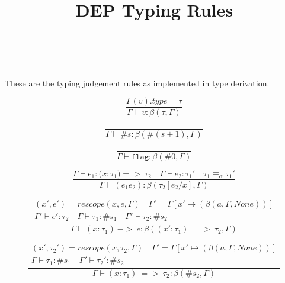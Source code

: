 \documentclass[12pt]{scrartcl}
\title{DEP Typing Rules}
\newcommand{\prove}[2]{\Gamma \vdash #1 : #2 }
\newcommand{\bprove}[2]{\prove{#1}{\beta(#2, \Gamma)}}
\begin{document}

\author{\thename \\ \small{\theemail}}
\maketitle


\noindent

These are the typing judgement rules as implemented in type derivation.

\begin{minipage}[c]{.35\linewidth}
\begin{equation}
  \frac{
    \Gamma(v).type = \tau
  }{\bprove{v}{\tau}}
\end{equation}

\begin{equation}
  \frac{
  }{\bprove{\#s}{\#(s+1)}}
\end{equation}

\begin{equation}
  \frac{
  }{\bprove{\mathtt{flag}}{\#0}}
\end{equation}
\end{minipage} \begin{minipage}[c]{0.6\linewidth}
\begin{equation}
  \frac{
    \prove{e_1}{\mathtt{(} x \mathtt{:} \tau_1 \mathtt{) => \:} \tau_2}{} \quad
    \prove{e_2}{\tau_1'} \quad
    \tau_1 \equiv_\alpha \tau_1'
  }{\bprove{(e_1 e_2)}{\tau_2[e_2/x]}}
\end{equation}

\begin{equation}
  \frac{
    \begin{array}{cc}
      (x', e') = rescope(x, e, \Gamma) \quad
      \Gamma' = \Gamma[x' \mapsto (\beta(a, \Gamma, None))] \\
      \Gamma' \vdash e' : \tau_2 \quad
      \prove{\tau_1}{\#s_1} \quad
      \Gamma' \vdash \tau_2 : \#s_2 \quad
    \end{array}
  }{\bprove{(x:\tau_1) \mathtt{\:->\:} e}{(x':\tau_1) \mathtt{\:=>\:}\tau_2}}
\end{equation}

\begin{equation}
  \frac{
    \begin{array}{cc}
      (x', \tau_2') = rescope(x, \tau_2, \Gamma) \quad
      \Gamma' = \Gamma[x' \mapsto (\beta(a, \Gamma, None))] \\
      \prove{\tau_1}{\#s_1} \quad
      \Gamma' \vdash \tau_2' : \#s_2 \quad
    \end{array}
  }{\bprove{(x:\tau_1) \mathtt{\:=>\:} \tau_2}{\#s_2}}
\end{equation}


\end{minipage}
\end{document}
